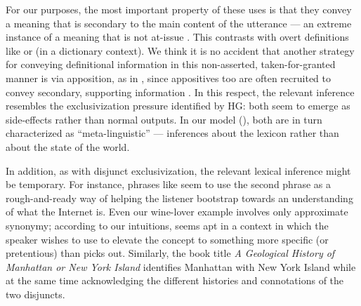 \documentclass[12pt,twoside]{article}
\renewcommand{\_}{\textbf{\textunderscore\hspace{-4pt}\textunderscore\hspace{-3pt}\textunderscore\hspace{-4pt}\textunderscore}\hspace{0.5pt}}			%
\begin{document}
For our purposes, the most important property of these uses is that
they convey a meaning that is secondary to the main content of the
utterance --- an extreme instance of a meaning that is not at-issue
\citep{Tonhauser-etal:2011,Dillon-etal:2014}. This contrasts with
overt definitions like  or
 (in a dictionary context).  We think it
is no accident that another strategy for conveying definitional
information in this non-asserted, taken-for-granted manner is via
apposition, as in , since appositives
too are often recruited to convey secondary, supporting information
\citep{Potts05BOOK,Potts08HSK,Syrett-etal:2014}. In this respect, the
relevant inference resembles the exclusivization pressure identified
by HG: both seem to emerge as side-effects rather than normal
outputs. In our model (), both are in turn
characterized as ``meta-linguistic'' --- inferences about the lexicon
rather than about the state of the world.

In addition, as with disjunct exclusivization, the relevant lexical
inference might be temporary. For instance, phrases like
 seem to use the second phrase as a
rough-and-ready way of helping the listener bootstrap towards an
understanding of what the Internet is. Even our wine-lover example
involves only approximate synonymy; according to our
intuitions, seems apt in a context in
which the speaker wishes to use  to elevate the
concept to something more specific (or pretentious) than  picks out. Similarly, the book title \emph{A Geological
  History of Manhattan or New York Island} identifies Manhattan with
New York Island while at the same time acknowledging the different
histories and connotations of the two disjuncts.
\end{document}
